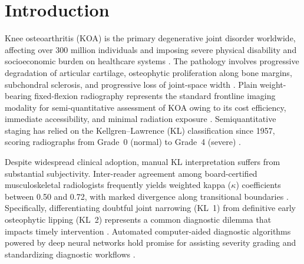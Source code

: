 \documentclass[10pt,journal]{IEEEtran}
\begin{document}
\section{Introduction}
\label{sec:introduction}

Knee osteoarthritis (KOA) is the primary degenerative joint disorder worldwide, affecting over 300 million individuals and imposing severe physical disability and socioeconomic burden on healthcare systems \cite{hunter2019oa, loeser2012oa}. The pathology involves progressive degradation of articular cartilage, osteophytic proliferation along bone margins, subchondral sclerosis, and progressive loss of joint-space width \cite{cross2014global, woolf2003burden}. Plain weight-bearing fixed-flexion radiography represents the standard frontline imaging modality for semi-quantitative assessment of KOA owing to its cost efficiency, immediate accessibility, and minimal radiation exposure \cite{braun2012diagnosis}. Semiquantitative staging has relied on the Kellgren--Lawrence (KL) classification since 1957, scoring radiographs from Grade~0 (normal) to Grade~4 (severe) \cite{kellgren1957radiological}.

Despite widespread clinical adoption, manual KL interpretation suffers from substantial subjectivity. Inter-reader agreement among board-certified musculoskeletal radiologists frequently yields weighted kappa ($\kappa$) coefficients between 0.50 and 0.72, with marked divergence along transitional boundaries \cite{wright2014interobserver, sheehy2015validity}. Specifically, differentiating doubtful joint narrowing (KL~1) from definitive early osteophytic lipping (KL~2) represents a common diagnostic dilemma that impacts timely intervention \cite{culvenor2019oa}. Automated computer-aided diagnostic algorithms powered by deep neural networks hold promise for assisting severity grading and standardizing diagnostic workflows \cite{tiulpin2018automatic, thomas2020automated, chen2019fully}.
\end{document}

